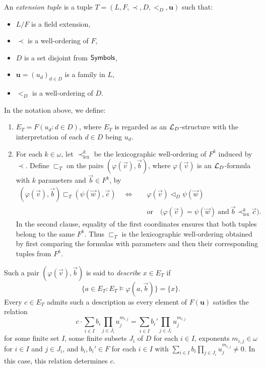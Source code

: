 \begin{definition}\label{def:formula-order}
An \emph{extension tuple} is a tuple $T=(L,F,\prec,D,<_D,\mathbf u)$ such that:
\begin{itemize}
    \item $L/F$ is a field extension,
    \item $\prec$ is a well-ordering of $F$,
    \item $D$ is a set disjoint from $\mathsf{Symbols}$,
    \item $\mathbf u=(u_d)_{d\in D}$ is a family in $L$,
    \item $<_D$ is a well-ordering of $D$.
\end{itemize}
In the notation above, we define:
\begin{enumerate}
    \item $E_T=F(u_d:d\in D)$, where $E_T$ is regarded as an $\mathcal L_D$-structure with the interpretation of each $d\in D$ being $u_d$.
    \item For each $k\in\omega$, let $\prec_{\mathrm{lex}}^k$ be the
    lexicographic well-ordering of $F^k$ induced by $\prec$. Define
    $\sqsubset_T$ on the pairs $(\varphi(\vec v),\vec b)$, where
    $\varphi(\vec v)$ is an $\mathcal L_D$-formula with $k$ parameters and
    $\vec b\in F^k$, by
    \[
    \begin{aligned}
    (\varphi(\vec v),\vec b)\mathrel{\sqsubset_T}
    (\psi(\vec w),\vec c)
    \quad\Longleftrightarrow\quad&
    \varphi(\vec v)\mathrel{\lhd_D}\psi(\vec w)\\
    &\text{or}\quad
    \bigl(\varphi(\vec v)=\psi(\vec w)
    \ \text{and}\ \vec b\mathrel{\prec_{\mathrm{lex}}^k}\vec c\bigr).
    \end{aligned}
    \]
    In the second clause, equality of the first coordinates ensures
    that both tuples belong to the same $F^k$. Thus $\sqsubset_T$ is
    the lexicographic well-ordering obtained by first comparing the
    formulas with parameters and then their corresponding tuples from
    $F^k$.
\end{enumerate}

Such a pair $(\varphi(\vec v),\vec b)$ is said to \emph{describe}
$x\in E_T$ if
\[
 \{a\in E_T:E_T\models\varphi(a,\vec b)\}=\{x\}.
\]
Every $c\in E_T$ admits such
a description as every element of $F(\mathbf u)$ satisfies the relation
\[
    c\cdot \sum_{i \in I} b_i\prod_{j \in J_i} u_j^{m_{i,j}} = \sum_{i \in I} b_i'\prod_{j \in J_i} u_j^{m_{i,j}}
\]
for some finite set $I$, some finite subsets $J_i$ of $D$ for each $i \in I$, exponents $m_{i,j}\in\omega$ for $i\in I$ and $j\in J_i$, and $b_i,b_i' \in F$ for each $i \in I$ with $\sum_{i \in I} b_i\prod_{j \in J_i} u_j^{m_{i,j}}\neq 0$.
In this case, this relation determines $c$.


\end{definition}
